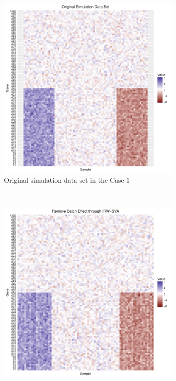 \documentclass[11pt]{article}
\begin{document}
\begin{figure}[h!]
    \centering
    \begin{subfigure}[b]{0.3\textwidth}
        \centering
        \includegraphics[width = \textwidth]{figures/simulate4.pdf}
        \caption{Original simulation data set in the Case 1}
    \end{subfigure}%
~
    \begin{subfigure}[b]{0.3\textwidth}
        \centering
        \includegraphics[width = \textwidth]{figures/sva4.pdf}

\end{subfigure}
\end{figure}
\end{document}
